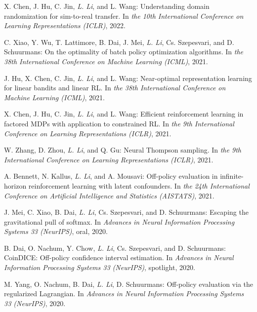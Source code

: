 \documentclass[10pt,twoside,letterpaper]{article}
\newcommand{\selffont}[1]{{\textit{#1}}}
\newcommand{\venuefont}[1]{{\textit{#1}}}
\newcommand{\myself}{\selffont{L. Li}}
\begin{document}
\begin{compactenum}[(C1)]

\item{X. Chen, J. Hu, C. Jin, \myself, and L. Wang: Understanding domain randomization for sim-to-real transfer. In \venuefont{the 10th International Conference on Learning Representations (ICLR)}, 2022.}

\item{C. Xiao, Y. Wu, T. Lattimore, B. Dai, J. Mei, \myself, Cs. Szepesvari, and D. Schuurmans: On the optimality of batch policy optimization algorithms. In \venuefont{the 38th International Conference on Machine Learning (ICML)}, 2021.}

\item{J. Hu, X. Chen, C. Jin, \myself, and L. Wang: Near-optimal representation learning for linear bandits and linear RL. In \venuefont{the 38th International Conference on Machine Learning (ICML)}, 2021.}

\item{X. Chen, J. Hu, C. Jin, \myself, and L. Wang: Efficient reinforcement learning in factored MDPs with application to constrained RL. In \venuefont{the 9th International Conference on Learning Representations (ICLR)}, 2021.}

\item{W. Zhang, D. Zhou, \myself, and Q. Gu: Neural Thompson sampling. In \venuefont{the 9th International Conference on Learning Representations (ICLR)}, 2021.}

\item{A. Bennett, N. Kallus, \myself, and A. Mousavi: Off-policy evaluation in infinite-horizon reinforcement learning with latent confounders. In \venuefont{the 24th International Conference on Artificial Intelligence and Statistics (AISTATS)}, 2021.}

\item{J. Mei, C. Xiao, B. Dai, \myself, Cs. Szepesvari, and D. Schuurmans: Escaping the gravitational pull of softmax. In \venuefont{Advances in Neural Information Processing Systems 33 (NeurIPS)}, oral, 2020.}

\item{B. Dai, O. Nachum, Y. Chow, \myself, Cs. Szepesvari, and D. Schuurmans: CoinDICE: Off-policy confidence interval estimation. In \venuefont{Advances in Neural Information Processing Systems 33 (NeurIPS)}, spotlight, 2020.}

\item{M. Yang, O. Nachum, B. Dai, \myself, D. Schuurmans: Off-policy evaluation via the regularized Lagrangian. In \venuefont{Advances in Neural Information Processing Systems 33 (NeurIPS)}, 2020.}


\end{compactenum}
\end{document}

